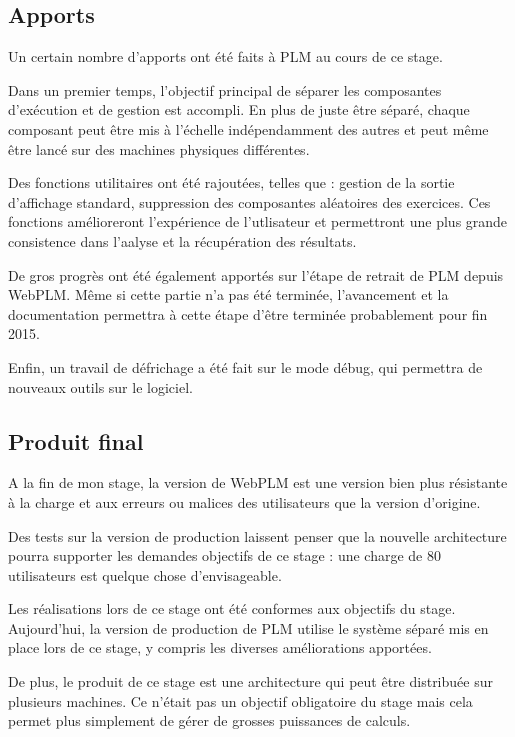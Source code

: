 \documentclass[stage]{tnreport}
\begin{document}
 \subsection{Apports}

Un certain nombre d'apports ont été faits à PLM au cours de ce stage.

Dans un premier temps, l'objectif principal de séparer les composantes d'exécution et de gestion est accompli. En plus de juste être séparé, chaque composant peut être mis à l'échelle indépendamment des autres et peut même être lancé sur des machines physiques différentes.

Des fonctions utilitaires ont été rajoutées, telles que : gestion de la sortie d'affichage standard, suppression des composantes aléatoires des exercices. Ces fonctions amélioreront l'expérience de l'utlisateur et permettront une plus grande consistence dans l'aalyse et la récupération des résultats.

De gros progrès ont été également apportés sur l'étape de retrait de PLM depuis WebPLM. Même si cette partie n'a pas été terminée, l'avancement et la documentation permettra à cette étape d'être terminée probablement pour fin 2015.

Enfin, un travail de défrichage a été fait sur le mode débug, qui permettra de nouveaux outils sur le logiciel.

\subsection{Produit final}

A la fin de mon stage, la version de WebPLM est une version bien plus résistante à la charge et aux erreurs ou malices des utilisateurs que la version d'origine.

Des tests sur la version de production laissent penser que la nouvelle architecture pourra supporter les demandes objectifs de ce stage : une charge de 80 utilisateurs est quelque chose d'envisageable.

Les réalisations lors de ce stage ont été conformes aux objectifs du stage. Aujourd'hui, la version de production de PLM utilise le système séparé mis en place lors de ce stage, y compris les diverses améliorations apportées.

De plus, le produit de ce stage est une architecture qui peut être distribuée sur plusieurs machines. Ce n'était pas un objectif obligatoire du stage mais cela permet plus simplement de gérer de grosses puissances de calculs.
\end{document}
